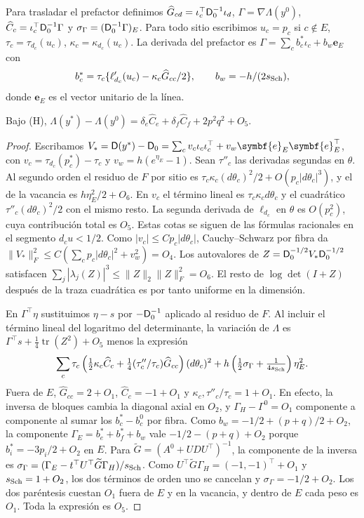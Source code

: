 Para trasladar el prefactor definimos
$\widehat G_{cd}=\iota_c^\top \mathsf D_0^{-1}\iota_d$,
$\Gamma=\nabla\Lambda(y^0)$, $\widehat C_c=\iota_c^\top \mathsf D_0^{-1}\Gamma$ y
$\sigma_\Gamma=(\mathsf D_0^{-1}\Gamma)_E$. Para todo sitio escribimos
$u_c=p_c$ si $c\notin E$, $\tau_c=\tau_{d_c}(u_c)$, $\kappa_c=\kappa_{d_c}(u_c)$.
La derivada del prefactor es $\Gamma=\sum_c b_c^*\iota_c+b_w\symbf{e}_E$ con
\[
 b_c^*=\tau_c\{\ell'_{d_c}(u_c)-\kappa_c\widehat G_{cc}/2\},\qquad b_w=-h/(2s_{\mathrm{Sch}}),
\]
donde $\symbf{e}_E$ es el vector unitario de la línea.

\begin{lema}\label{lem:linea-traza}
Bajo (H), $\Lambda(y^*)-\Lambda(y^0)=
\delta_e\widehat C_e+\delta_f\widehat C_f+2p^2q^2+O_5$.
\end{lema}
\begin{proof}
Escribamos $V_*=\hessloc(y^*)-\hessloc_0=\sum_c v_c\iota_c\iota_c^\top
+v_w\symbf{e}_E\symbf{e}_E^\top$, con $v_c=\tau_{d_c}(p_c^*)-\tau_c$
y $v_w=h(e^{\eta_E}-1)$. Sean $\tau''_c$ las derivadas segundas en $\theta$.
Al segundo orden el residuo de $F$ por sitio es
$\tau_c\kappa_c(d\theta_c)^2/2+O(p_c|d\theta_c|^3)$, y el de la vacancia
es $h\eta_E^2/2+O_6$. En $v_c$ el término lineal es $\tau_c\kappa_c d\theta_c$
y el cuadrático $\tau''_c(d\theta_c)^2/2$ con el mismo resto. La segunda derivada de
$\ell_{d_c}$ en $\theta$ es $O(p_c^2)$, cuya contribución total es $O_5$.
Estas cotas se siguen de las fórmulas racionales en el segmento $d_cu<1/2$.
Como $|v_c|\le C p_c|d\theta_c|$, Cauchy--Schwarz por fibra da
$\|V_*\|_F^2\le C(\sum_c p_c|d\theta_c|^2+v_w^2)=O_4$.
Los autovalores de $Z=\mathsf D_0^{-1/2}V_*\mathsf D_0^{-1/2}$ satisfacen
$\sum_j|\lambda_j(Z)|^3\le\|Z\|_2\|Z\|_F^2=O_6$. El resto de $\log\det(I+Z)$
después de la traza cuadrática es por tanto uniforme en la dimensión.

En $\Gamma^\top\eta$ sustituimos $\eta-s$ por $-\mathsf D_0^{-1}$ aplicado al residuo de $F$.
Al incluir el término lineal del logaritmo del determinante, la variación de $\Lambda$
es $\Gamma^\top s+\tfrac14\operatorname{tr}(Z^2)+O_5$ menos la expresión
\[
 \sum_c\tau_c\left(\tfrac12\kappa_c\widehat C_c+
 \tfrac14(\tau''_c/\tau_c)\widehat G_{cc}\right)(d\theta_c)^2
 +h\left(\tfrac12\sigma_\Gamma+\tfrac1{4s_{\mathrm{Sch}}}\right)\eta_E^2 .
\]
Fuera de $E$, $\widehat G_{cc}=2+O_1$, $\widehat C_c=-1+O_1$ y
$\kappa_c,\tau''_c/\tau_c=1+O_1$. En efecto, la inversa de bloques cambia la
diagonal axial en $O_2$, y $\Gamma_H-\Gamma^0=O_1$ componente a componente
al sumar los $b_c^*-b_c^0$ por fibra. Como $b_w=-1/2+(p+q)/2+O_2$, la componente
$\Gamma_E=b_e^*+b_f^*+b_w$ vale $-1/2-(p+q)+O_2$ porque $b_i^*=-3p_i/2+O_2$ en $E$.
Para $\widetilde G=(A^0+UDU^\top)^{-1}$, la componente de la inversa es
$\sigma_\Gamma=(\Gamma_E-t^\top U^\top\widetilde G\Gamma_H)/s_{\mathrm{Sch}}$.
Como $U^\top\widetilde G\Gamma_H=(-1,-1)^\top+O_1$ y $s_{\mathrm{Sch}}=1+O_2$,
los dos términos de orden uno se cancelan y $\sigma_\Gamma=-1/2+O_2$.
Los dos paréntesis cuestan $O_1$ fuera de $E$ y en la vacancia,
y dentro de $E$ cada peso es $O_1$. Toda la expresión es $O_5$.


\end{proof}
